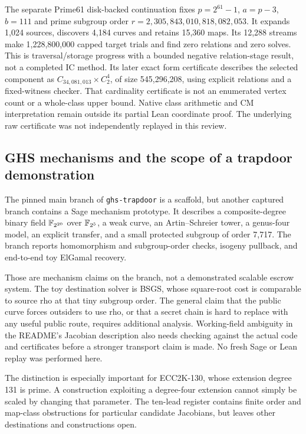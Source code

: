 The separate Prime61 disk-backed continuation fixes
$p=2^{61}-1$, $a=p-3$, $b=111$ and prime subgroup order
$r=2,305,843,010,818,082,053$. It expands 1,024 sources,
discovers 4,184 curves and retains 15,360 maps. Its 12,288 streams make
1,228,800,000 capped target trials and find zero relations and zero solves.
This is traversal/storage progress with a bounded negative relation-stage
result, not a completed IC method. Its later exact form certificate
describes the selected component as $C_{34,081,013}\times C_2^4$, of
size 545,296,208, using explicit relations and a fixed-witness checker.
That cardinality certificate is not an enumerated vertex count or a
whole-class upper bound. Native class arithmetic and CM interpretation
remain outside its partial Lean coordinate proof. The underlying raw
certificate was not independently replayed in this review.

\subsection{GHS mechanisms and the scope of a trapdoor demonstration}

The pinned main branch of \texttt{ghs-trapdoor} is a scaffold, but another
captured branch contains a Sage mechanism prototype. It describes a
composite-degree binary field $\mathbb F_{2^{20}}$ over $\mathbb F_{2^5}$, a weak curve,
an Artin--Schreier tower, a genus-four model, an explicit transfer, and a
small protected subgroup of order 7,717. The branch reports
homomorphism and subgroup-order checks, isogeny pullback, and end-to-end
toy ElGamal recovery.

Those are mechanism claims on the branch, not a demonstrated scalable
escrow system. The toy destination solver is BSGS, whose square-root
cost is comparable to source rho at that tiny subgroup order. The
general claim that the public curve forces outsiders to use rho, or
that a secret chain is hard to replace with any useful public route,
requires additional analysis. Working-field ambiguity in the README's
Jacobian description also needs checking against the actual code and
certificates before a stronger transport claim is made. No fresh Sage
or Lean replay was performed here.

The distinction is especially important for ECC2K-130, whose extension
degree 131 is prime. A construction exploiting a degree-four extension
cannot simply be scaled by changing that parameter. The ten-lead
register contains finite order and map-class obstructions for particular
candidate Jacobians, but leaves other destinations and constructions
open.

